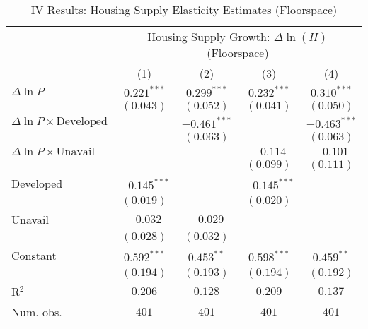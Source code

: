 
\begin{table}
\caption{IV Results: Housing Supply Elasticity Estimates (Floorspace)}
\begin{center}
\begin{normalsize}
\begin{threeparttable}
\begin{tabular}{l@{} c@{} c@{} c@{} c@{}}
\toprule
 & \multicolumn{4}{c}{Housing Supply Growth: $\Delta\ln(H)$ (Floorspace)} \\
\cmidrule(lr){2-5}
 & (1) & (2) & (3) & (4) \\
\midrule
$\Delta\ln P$                         & $0.221^{***}$  & $0.299^{***}$  & $0.232^{***}$  & $0.310^{***}$  \\
                                      & $(0.043)$      & $(0.052)$      & $(0.041)$      & $(0.050)$      \\
$\Delta\ln P\times{\text{Developed}}$ &                & $-0.461^{***}$ &                & $-0.463^{***}$ \\
                                      &                & $(0.063)$      &                & $(0.063)$      \\
$\Delta\ln P\times{\text{Unavail}}$   &                &                & $-0.114$       & $-0.101$       \\
                                      &                &                & $(0.099)$      & $(0.111)$      \\
Developed                             & $-0.145^{***}$ &                & $-0.145^{***}$ &                \\
                                      & $(0.019)$      &                & $(0.020)$      &                \\
Unavail                               & $-0.032$       & $-0.029$       &                &                \\
                                      & $(0.028)$      & $(0.032)$      &                &                \\
Constant                              & $0.592^{***}$  & $0.453^{**}$   & $0.598^{***}$  & $0.459^{**}$   \\
                                      & $(0.194)$      & $(0.193)$      & $(0.194)$      & $(0.192)$      \\
\midrule
R$^2$                                 & $0.206$        & $0.128$        & $0.209$        & $0.137$        \\
Num. obs.                             & $401$          & $401$          & $401$          & $401$          \\

\end{tabular}
\end{threeparttable}
\end{normalsize}
\end{center}
\end{table}
